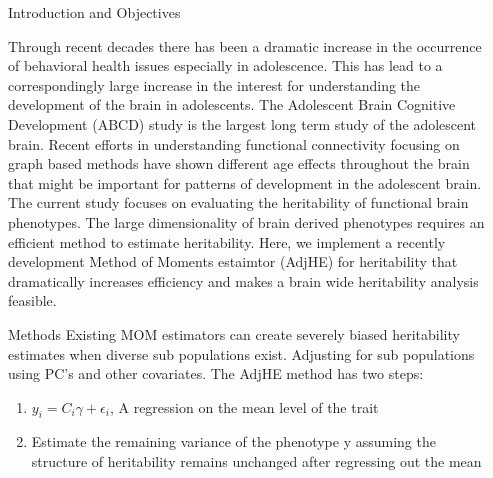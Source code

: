 \documentclass[final]{beamer}
\newlength{\sepwid}
\newlength{\onecolwid}
\begin{document}
\begin{frame}[t] %
\begin{columns}[t] %
\begin{column}{\sepwid}\end{column} %
\begin{column}{\onecolwid} %
\begin{block}{Introduction and Objectives}

Through recent decades there has been a dramatic increase in the occurrence of behavioral health issues especially in adolescence. This has lead to a correspondingly large increase in the interest for understanding the development of the brain in adolescents. The Adolescent Brain Cognitive Development (ABCD) study is the largest long term study of the adolescent brain. Recent efforts in understanding functional connectivity focusing on graph based methods have shown different age effects throughout the brain that might be important for patterns of development in the adolescent brain. The current study focuses on evaluating the heritability of functional brain phenotypes. The large dimensionality of brain derived phenotypes requires an efficient method to estimate heritability. Here, we implement a recently development Method of Moments estaimtor (AdjHE) for heritability that dramatically increases efficiency and makes a brain wide heritability analysis feasible. 
\end{block}

\vspace{1in}

\begin{block}{Methods}
Existing MOM estimators can create severely biased heritability estimates when diverse sub populations exist. Adjusting for sub populations using PC's and other covariates. The AdjHE method has two steps:
\begin{enumerate}
    \item $y_i = C_i\gamma + \epsilon_i$, A regression on the mean level of the trait
    \item Estimate the remaining variance of the phenotype y assuming the structure of heritability remains unchanged after regressing out the mean
\end{enumerate}


\end{block}
\end{column}
\end{columns}
\end{frame}
\end{document}
